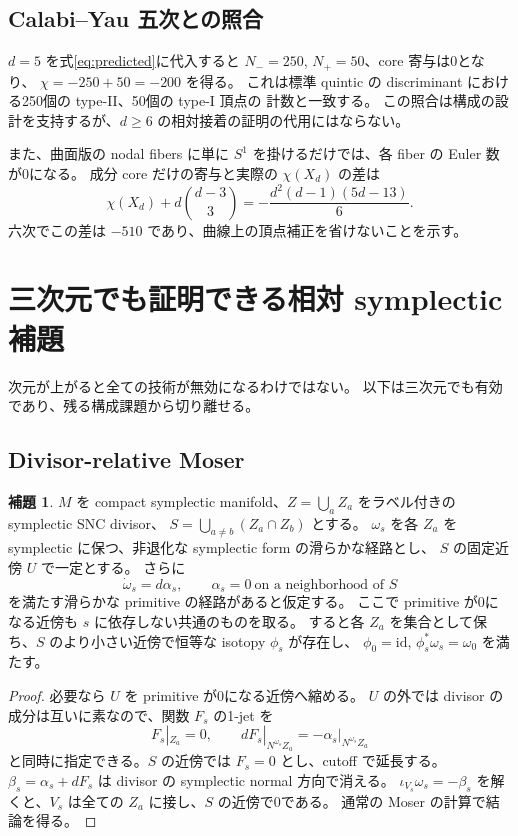 \documentclass[11pt,a4paper]{article}
\theoremstyle{definition}
\newtheorem{lemma}[theorem]{補題}
\begin{document}
\subsection{Calabi--Yau 五次との照合}

$d=5$ を式\eqref{eq:predicted}に代入すると $N_-=250$, $N_+=50$、core 寄与は0となり、
$\chi=-250+50=-200$ を得る。
これは標準 quintic の discriminant における250個の type-II、50個の type-I 頂点の
計数と一致する\cite[Example 2.5]{agis}。
この照合は構成の設計を支持するが、$d\ge6$ の相対接着の証明の代用にはならない。

また、曲面版の nodal fibers に単に $S^1$ を掛けるだけでは、各 fiber の Euler 数が0になる。
成分 core だけの寄与と実際の $\chi(X_d)$ の差は
\[
\chi(X_d)+d\binom{d-3}{3}
=-\frac{d^2(d-1)(5d-13)}6.
\]
六次でこの差は $-510$ であり、曲線上の頂点補正を省けないことを示す。

\section{三次元でも証明できる相対 symplectic 補題}\label{sec:lemmas}

次元が上がると全ての技術が無効になるわけではない。
以下は三次元でも有効であり、残る構成課題から切り離せる。

\subsection{Divisor-relative Moser}

\begin{lemma}\label{lem:moser}
$M$ を compact symplectic manifold、$Z=\bigcup_aZ_a$ をラベル付きの symplectic SNC divisor、
$S=\bigcup_{a\ne b}(Z_a\cap Z_b)$ とする。
$\omega_s$ を各 $Z_a$ を symplectic に保つ、非退化な symplectic form の滑らかな経路とし、
$S$ の固定近傍 $U$ で一定とする。
さらに
\[
\dot\omega_s=d\alpha_s,\qquad \alpha_s=0\ \text{on a neighborhood of }S
\]
を満たす滑らかな primitive の経路があると仮定する。
ここで primitive が0になる近傍も $s$ に依存しない共通のものを取る。
すると各 $Z_a$ を集合として保ち、$S$ のより小さい近傍で恒等な isotopy $\phi_s$ が存在し、
$\phi_0=\mathrm{id}$, $\phi_s^*\omega_s=\omega_0$ を満たす。
\end{lemma}

\begin{proof}
必要なら $U$ を primitive が0になる近傍へ縮める。
$U$ の外では divisor の成分は互いに素なので、関数 $F_s$ の1-jet を
\[
F_s|_{Z_a}=0,\qquad
dF_s|_{N^{\omega_s}Z_a}=-\alpha_s|_{N^{\omega_s}Z_a}
\]
と同時に指定できる。$S$ の近傍では $F_s=0$ とし、cutoff で延長する。
$\beta_s=\alpha_s+dF_s$ は divisor の symplectic normal 方向で消える。
$\iota_{V_s}\omega_s=-\beta_s$ を解くと、$V_s$ は全ての $Z_a$ に接し、$S$ の近傍で0である。
通常の Moser の計算で結論を得る。
\end{proof}
\end{document}
